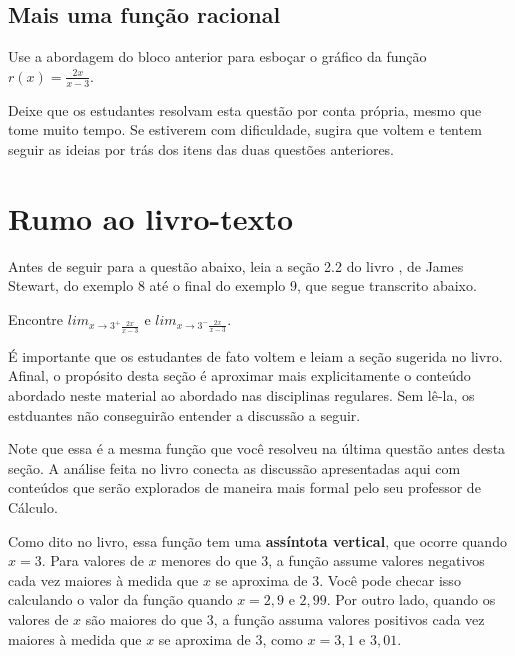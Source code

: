 \documentclass[main.tex]{subfiles}
\begin{document}
\subsection*{Mais uma função racional}

\begin{questao}
Use a abordagem do bloco anterior para esboçar o gráfico da função $r(x)=\frac{2x}{x-3}$.
\end{questao}
\newpage

\paraTutores

Deixe que os estudantes resolvam esta questão por conta própria, mesmo que tome muito tempo. Se estiverem com dificuldade, sugira que voltem e tentem seguir as ideias por trás dos itens das duas questões anteriores.

\paraAmbos

\section{Rumo ao livro-texto}

Antes de seguir para a questão abaixo, leia a seção 2.2 do livro , de James Stewart, do exemplo 8 até o final do exemplo 9, que segue transcrito abaixo.

\begin{resolvida}
Encontre $lim_{x\rightarrow3^+ \frac{2x}{x-3}}$ e $lim_{x\rightarrow3^- \frac{2x}{x-3}}$.
\end{resolvida}

\paraTutores

É importante que os estudantes de fato voltem e leiam a seção sugerida no livro. Afinal, o propósito desta seção é aproximar mais explicitamente o conteúdo abordado neste material ao abordado nas disciplinas regulares. Sem lê-la, os estduantes não conseguirão entender a discussão a seguir.

\paraAmbos

Note que essa é a mesma função que você resolveu na última questão antes desta seção. A análise feita no livro conecta as discussão apresentadas aqui com conteúdos que serão explorados de maneira mais formal pelo seu professor de Cálculo.

Como dito no livro, essa função tem uma \textbf{assíntota vertical}, que ocorre quando $x=3$. Para valores de $x$ menores do que 3, a função assume valores negativos cada vez maiores à medida que $x$ se aproxima de $3$. Você pode checar isso calculando o valor da função quando $x=2,9$ e $2,99$. Por outro lado, quando os valores de $x$ são maiores do que $3$, a função assuma valores positivos cada vez maiores à medida que $x$ se aproxima de $3$, como $x=3,1$ e $3,01$.
\end{document}
